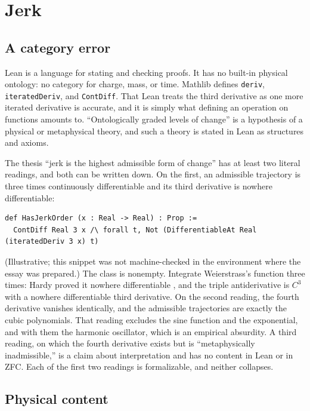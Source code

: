 \documentclass[11pt]{article}
\begin{document}
\section{Jerk}

\subsection{A category error}

Lean is a language for stating and checking proofs. It has no built-in physical ontology: no category for charge, mass, or time. Mathlib defines \texttt{deriv}, \texttt{iteratedDeriv}, and \texttt{ContDiff}. That Lean treats the third derivative as one more iterated derivative is accurate, and it is simply what defining an operation on functions amounts to. ``Ontologically graded levels of change'' is a hypothesis of a physical or metaphysical theory, and such a theory is stated in Lean as structures and axioms.

The thesis ``jerk is the highest admissible form of change'' has at least two literal readings, and both can be written down. On the first, an admissible trajectory is three times continuously differentiable and its third derivative is nowhere differentiable:
\begin{lstlisting}
def HasJerkOrder (x : Real -> Real) : Prop :=
  ContDiff Real 3 x /\ forall t, Not (DifferentiableAt Real (iteratedDeriv 3 x) t)
\end{lstlisting}
(Illustrative; this snippet was not machine-checked in the environment where the essay was prepared.) The class is nonempty. Integrate Weierstrass's function three times: Hardy proved it nowhere differentiable \cite{hardy1916}, and the triple antiderivative is $C^3$ with a nowhere differentiable third derivative. On the second reading, the fourth derivative vanishes identically, and the admissible trajectories are exactly the cubic polynomials. That reading excludes the sine function and the exponential, and with them the harmonic oscillator, which is an empirical absurdity. A third reading, on which the fourth derivative exists but is ``metaphysically inadmissible,'' is a claim about interpretation and has no content in Lean or in ZFC. Each of the first two readings is formalizable, and neither collapses.

\subsection{Physical content}
\end{document}
